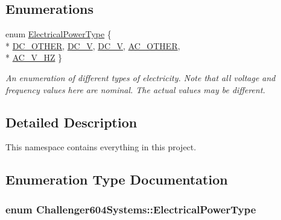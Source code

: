 \subsection*{Enumerations}
\begin{DoxyCompactItemize}
\item 
enum \hyperlink{namespace_challenger604_systems_a9ad1a793d94b97514092692cb7315afd}{Electrical\-Power\-Type} \{ \\*
\hyperlink{namespace_challenger604_systems_a9ad1a793d94b97514092692cb7315afdac443cb4f2e9c8fb362d1b23d390680c1}{D\-C\-\_\-\-O\-T\-H\-E\-R}, 
\hyperlink{namespace_challenger604_systems_a9ad1a793d94b97514092692cb7315afdaeb46efa4ea7afd565b7f41c0881a206d}{D\-C\-\_\-V}, 
\hyperlink{namespace_challenger604_systems_a9ad1a793d94b97514092692cb7315afdaa549263d4db7adacf1008dac6a68b21d}{D\-C\-\_\-V}, 
\hyperlink{namespace_challenger604_systems_a9ad1a793d94b97514092692cb7315afda2fcb938b597382142bdc684898fe8596}{A\-C\-\_\-\-O\-T\-H\-E\-R}, 
\\*
\hyperlink{namespace_challenger604_systems_a9ad1a793d94b97514092692cb7315afdade695fe37c4e590d464845feb03fcfde}{A\-C\-\_\-V\-\_\-H\-Z}
 \}
\begin{DoxyCompactList}\small\item\em An enumeration of different types of electricity. Note that all voltage and frequency values here are nominal. The actual values may be different. \end{DoxyCompactList}\end{DoxyCompactItemize}


\subsection{Detailed Description}
This namespace contains everything in this project. 

\subsection{Enumeration Type Documentation}
\hypertarget{namespace_challenger604_systems_a9ad1a793d94b97514092692cb7315afd}{
\subsubsection[{Electrical\-Power\-Type}]{\setlength{\rightskip}{0pt plus 5cm}enum {\bf Challenger604\-Systems\-::\-Electrical\-Power\-Type}}}\label{namespace_challenger604_systems_a9ad1a793d94b97514092692cb7315afd}


